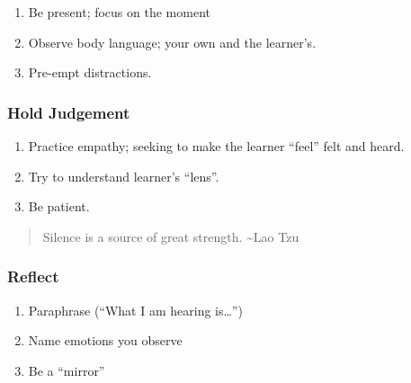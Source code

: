 \documentclass[
]{book}
\providecommand{\tightlist}{%
  \setlength{\itemsep}{0pt}\setlength{\parskip}{0pt}}
\begin{document}
\begin{enumerate}
\def\labelenumi{\arabic{enumi}.}
\tightlist
\item
  Be present; focus on the moment
\item
  Observe body language; your own and the learner's.
\item
  Pre-empt distractions.
\end{enumerate}

\hypertarget{hold-judgement}{%
\subsubsection*{Hold Judgement}\label{hold-judgement}}

\begin{enumerate}
\def\labelenumi{\arabic{enumi}.}
\tightlist
\item
  Practice empathy; seeking to make the learner ``feel'' felt and heard.
\item
  Try to understand learner's ``lens''.
\item
  Be patient.
\end{enumerate}

\begin{quote}
Silence is a source of great strength.
\textasciitilde Lao Tzu
\end{quote}

\hypertarget{reflect-1}{%
\subsubsection*{Reflect}\label{reflect-1}}

\begin{enumerate}
\def\labelenumi{\arabic{enumi}.}
\tightlist
\item
  Paraphrase (``What I am hearing is\ldots{}'')
\item
  Name emotions you observe
\item
  Be a ``mirror''
\end{enumerate}
\end{document}
